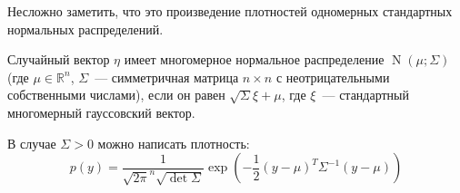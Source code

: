 \documentclass{article}
\begin{document}
    \begin{property}
        Несложно заметить, что это произведение плотностей одномерных стандартных нормальных распределений.
    \end{property}
    \begin{example}
        Случайный вектор $\eta$ имеет многомерное нормальное распределение $\operatorname{N}(\mu;\Sigma)$ (где $\mu\in\mathbb R^n$, $\Sigma$~--- симметричная матрица $n\times n$ с неотрицательными собственными числами), если он равен $\sqrt\Sigma\xi+\mu$, где $\xi$~--- стандартный многомерный гауссовский вектор.
    \end{example}
    \begin{remark}
        В случае $\Sigma>0$ можно написать плотность:
        $$
        p(y)=\frac1{\sqrt{2\pi}^n\sqrt{\det\Sigma}}\exp\left(-\frac12(y-\mu)^T\Sigma^{-1}(y-\mu)\right)
        $$
    \end{remark}
 
\end{document}
